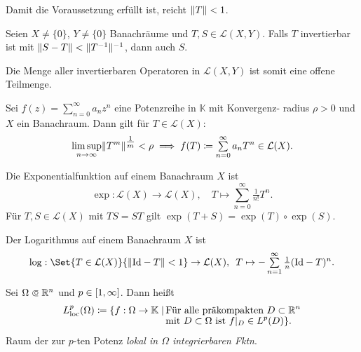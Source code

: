 \documentclass{cheat-sheet}
\newcommand{\K}{\mathbb{K}}
\newcommand{\LSO}{\mathcal{L}} %
\begin{document}
\begin{bem}
  Damit die Voraussetzung erfüllt ist, reicht $\lVert T\rVert < 1$.
\end{bem}

\begin{satz}
  Seien $X \not= \{0\}$, $Y \not= \{0\}$ Banachräume und $T, S \in \mathcal{L}(X, Y)$. Falls $T$ invertierbar ist mit $\lVert S-T\rVert < \lVert T^{-1}\rVert^{-1}$, dann auch $S$.
\end{satz}

\begin{bem}
  Die Menge aller invertierbaren Operatoren in $\mathcal{L}(X, Y)$ ist somit eine offene Teilmenge.
\end{bem}

\begin{satz}
  Sei $f(z) = \sum_{n=0}^\infty a_n z^n$ eine Potenzreihe in $\K$ mit Konvergenz- radius $\rho > 0$ und $X$ ein Banachraum. Dann gilt für $T \in \LSO(X)$:
  \[ \limsup_{n \to \infty} \norm{T^m}^{\tfrac{1}{m}} < \rho \implies f(T) \coloneqq \sum_{n=0}^\infty a_n T^n \in \LSO(X). \]
\end{satz}

\begin{bsp}
  Die Exponentialfunktion auf einem Banachraum $X$ ist
  \[ \exp : \LSO(X) \to \LSO(X), \quad T \mapsto \sum_{n=0}^\infty \tfrac{1}{n!} T^n. \]
  Für $T, S \in \LSO(X)$ mit $TS = ST$ gilt $\exp(T+S) = \exp(T) \circ \exp(S)$.
\end{bsp}


\begin{bsp}
  Der Logarithmus auf einem Banachraum $X$ ist
  \[
    \log : \Set{ T \in \LSO(X) }{ \norm{\Id - T} < 1 } \to \LSO(X), \enspace T \mapsto - \sum_{n=1}^{\infty} \tfrac{1}{n} (\Id - T)^n.
  \]
\end{bsp}

\begin{defn}
  Sei $\Omega \opn \R^n$ und $p \in \left[ 1, \infty \right]$. Dann heißt
  \begin{align*}
    L_{\mathrm{loc}}^p(\Omega) \coloneqq \{ f : \Omega \to \K \mid \, &\text{Für alle präkompakten $D \subset \R^n$}\\[-4pt]
    &\text{mit $D \subset \Omega$ ist $f|_D \in L^p(D)$} \}.
  \end{align*}
  Raum der zur $p$-ten Potenz \emph{lokal in $\Omega$ integrierbaren Fktn}.
\end{defn}
\end{document}
